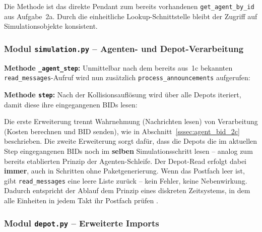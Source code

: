 Die Methode ist das direkte Pendant zum bereits vorhandenen \texttt{get\_agent\_by\_id} aus Aufgabe~2a. Durch die einheitliche Lookup-Schnittstelle bleibt der Zugriff auf Simulationsobjekte konsistent.


\subsubsection{Modul \texttt{simulation.py} – Agenten- und Depot-Verarbeitung}

\textbf{Methode \texttt{\_agent\_step}:} Unmittelbar nach dem bereits aus~1c bekannten \texttt{read\_messages}-Aufruf wird nun zusätzlich \texttt{process\_announcements} aufgerufen:



\textbf{Methode \texttt{step}:} Nach der Kollisionsauflösung wird über alle Depots iteriert, damit diese ihre eingegangenen BIDs lesen:



Die erste Erweiterung trennt Wahrnehmung (Nachrichten lesen) von Verarbeitung (Kosten berechnen und BID senden), wie in Abschnitt~\ref{sssec:agent_bid_2c} beschrieben. Die zweite Erweiterung sorgt dafür, dass die Depots die im aktuellen Step eingegangenen BIDs noch im \textbf{selben} Simulationsschritt lesen -- analog zum bereits etablierten Prinzip der Agenten-Schleife. Der Depot-Read erfolgt dabei \textbf{immer}, auch in Schritten ohne Paketgenerierung. Wenn das Postfach leer ist, gibt \texttt{read\_messages} eine leere Liste zurück -- kein Fehler, keine Nebenwirkung. Dadurch entspricht der Ablauf dem Prinzip eines diskreten Zeitsystems, in dem alle Einheiten in jedem Takt ihr Postfach prüfen \cite[S. 13]{5}.


\subsubsection{Modul \texttt{depot.py} – Erweiterte Imports}

